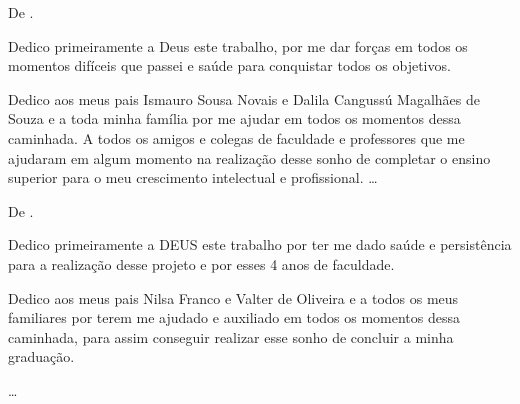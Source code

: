 

\begin{dedicatoria}


\vspace*{\fill}
\vspace*{\fill}
\vspace*{\fill}
\vspace*{\fill}
\vspace*{\fill}
\vspace*{\fill}
De \imprimirAutorUm.
\newline
\par Dedico primeiramente a Deus este trabalho, por me dar forças em todos os momentos difíceis que passei e saúde para conquistar todos os objetivos.
\par Dedico aos meus pais Ismauro Sousa Novais e Dalila Cangussú Magalhães de Souza e a toda minha família por me ajudar em todos os momentos dessa caminhada.
A todos os amigos e colegas de faculdade e professores que me ajudaram em algum momento na realização desse sonho de completar o ensino superior para o meu crescimento intelectual e profissional.
 \ldots 

\vspace*{\fill}
De \imprimirAutorDois.
\newline
\par Dedico primeiramente a DEUS este trabalho por ter me dado saúde e persistência para a realização desse projeto e por esses 4 anos de faculdade.
\par Dedico aos meus pais Nilsa Franco e Valter de Oliveira e a todos os meus familiares por terem me ajudado e auxiliado em todos os momentos dessa caminhada, para assim conseguir realizar esse sonho de concluir a minha graduação.
\par \ldots

\end{dedicatoria}


